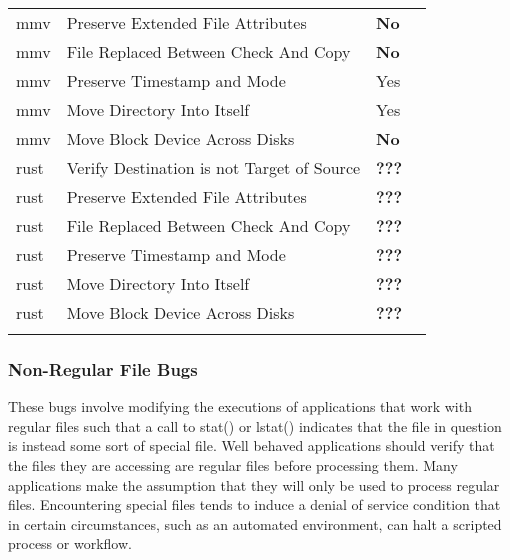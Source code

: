 \begin{table}[H]
\begin{tabular}{l  l  l  l}
                  mmv & Preserve Extended File Attributes & \textbf{No}\\
                  mmv & File Replaced Between Check And Copy & \textbf{No}\\
                  mmv & Preserve Timestamp and Mode & Yes\\
                  mmv & Move Directory Into Itself & Yes\\
                  mmv & Move Block Device Across Disks & \textbf{No}\\
                  rust & Verify Destination is not Target of Source& \textbf{???}\\
                  rust & Preserve Extended File Attributes & \textbf{???}\\
                  rust & File Replaced Between Check And Copy & \textbf{???}\\
                  rust & Preserve Timestamp and Mode & \textbf{???}\\
                  rust & Move Directory Into Itself & \textbf{???}\\
                  rust & Move Block Device Across Disks & \textbf{???}\\
                \bottomrule{}
                \end{tabular}
            \end{table}

        \subsubsection{Non-Regular File Bugs}

        These bugs involve modifying the executions of applications that work with regular files such that a call to
        stat() or lstat() indicates that the file in question is instead some sort of special file.  Well behaved
        applications should verify that the files they are accessing are regular files before processing them.  Many
        applications make the assumption that they will only be used to process regular files.  Encountering special
        files tends to induce a denial of service condition that in certain circumstances, such as an automated
        environment, can halt a scripted process or workflow.

